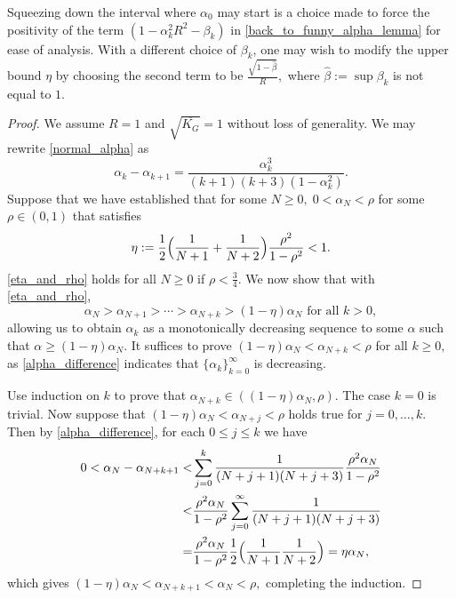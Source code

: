 \documentclass[10pt,a4paper]{amsart}
\begin{document}
\begin{remark}
    Squeezing down the interval where $\alpha_{0}$ may start is a choice made to force the positivity of the term $(1 - \alpha_{k}^{2}R^{2} - \beta_{k})$ in \eqref{back_to_funny_alpha_lemma} for ease of analysis.
    With a different choice of $\beta_{k}$, one may wish to modify the upper bound $\eta$ by choosing the second term to be $\displaystyle \frac{\sqrt{1 - \hat{\beta}}}{R},$ where $\hat{\beta} := \sup \beta_{k}$ is not equal to $1.$
\end{remark}

\begin{proof}
    We assume $R = 1$ and $\sqrt{\overline{K_{G}}} = 1$ without loss of generality.
    We may rewrite \eqref{normal_alpha} as
    \begin{equation}
        \alpha_{k} - \alpha_{k+1} = \frac{\alpha_{k}^{3}}{(k+1)(k+3)(1 - \alpha_{k}^{2})}. \label{alpha_difference}
    \end{equation}
    Suppose that we have established that for some $N \geq 0, \; 0 < \alpha_{N} < \rho$ for some $\rho \in (0,1)$ that satisfies 
    \begin{equation}
        \eta := \frac{1}{2}\Big{(}\frac{1}{N + 1} + \frac{1}{N+2} \Big{)}\frac{\rho^{2}}{1-\rho^{2}} < 1. \label{eta_and_rho}
    \end{equation}
    \eqref{eta_and_rho} holds for all $N \geq 0$ if $\rho < \frac{3}{4}.$
    We now show that with \eqref{eta_and_rho},
    \begin{equation*}
        \alpha_{N} > \alpha_{N+1} > \cdots > \alpha_{N+k} > (1-\eta)\alpha_{N} \text{ for all }k > 0,
    \end{equation*}
    allowing us to obtain $\alpha_{k}$ as a monotonically decreasing sequence to some $\alpha$ such that $\alpha \geq (1-\eta)\alpha_{N}$.
    It suffices to prove $(1-\eta)\alpha_{N} < \alpha_{N+k} < \rho$ for all $k \geq 0,$ as \eqref{alpha_difference} indicates that $\{\alpha_{k}\}_{k=0}^{\infty}$ is decreasing.

    Use induction on $k$ to prove that $\alpha_{N+k} \in ((1-\eta)\alpha_{N},\rho)$.
    The case $k=0$ is trivial.
    Now suppose that $(1-\eta)\alpha_{N} < \alpha_{N+j} < \rho$ holds true for $j = 0, \ldots, k.$
    Then by \eqref{alpha_difference}, for each $0 \leq j \leq k$ we have
    \begin{align*}
        0 < \alpha_{N} - \alpha_{N+k+1} <& \sum_{j=0}^{k} \frac{1}{(N+j+1)(N+j+3)} \frac{\rho^{2}\alpha_{N}}{1-\rho^{2}} \\
        <& \frac{\rho^{2}\alpha_{N}}{1-\rho^{2}} \sum_{j=0}^{\infty} \frac{1}{(N+j+1)(N+j+3)} \\
        =& \frac{\rho^{2}\alpha_{N}}{1-\rho^{2}} \frac{1}{2} \Big{(} \frac{1}{N+1} \frac{1}{N+2}\Big{)} = \eta \alpha_{N},
    \end{align*}
    which gives $(1-\eta) \alpha_{N} < \alpha_{N+k+1} < \alpha_{N} < \rho,$ completing the induction.
\end{proof}
\end{document}
